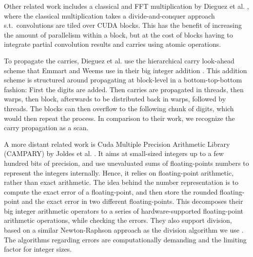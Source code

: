 Other related work includes a classical and FFT multiplication by Dieguez et
al. \cite{doi:10.1177/10943420221077964}, where the classical multiplication
takes a divide-and-conquer approach s.t.\ convolutions are tiled over CUDA
blocks. This has the benefit of increasing the amount of parallelism within a
block, but at the cost of blocks having to integrate partial convolution results
and carries using atomic operations.

To propagate the carries, Dieguez et al. use the hierarchical carry look-ahead
scheme that Emmart and Weems use in their big integer addition
\cite{Emmart2010HighPI}. This addition scheme is structured around propagating
at block-level in a bottom-top-bottom fashion: First the digits are added. Then
carries are propagated in threads, then warps, then block, afterwards to be
distributed back in warps, followed by threads. The blocks can then overflow to
the following chunk of digits, which would then repeat the process. In
comparison to their work, we recognize the carry propagation as a scan.

A more distant related work is Cuda Multiple Precision Arithmetic Library
(CAMPARY) by Joldes et al. \cite{Joldes2016CAMPARYCM}. It aims at small-sized
integers up to a few hundred bits of precision, and use unevaluated sums of
floating-points numbers to represent the integers internally. Hence, it relies
on floating-point arithmetic, rather than exact arithmetic. The idea behind the
number representation is to compute the exact error of a floating-point, and
then store the rounded floating-point and the exact error in two different
floating-points. This decomposes their big integer arithmetic operators to a
series of hardware-supported floating-point arithmetic operations, while
checking the errors. They also support division, based on a similar
Newton-Raphson approach as the division algorithm we use
\cite{watt2023efficient}. The algorithms regarding errors are computationally
demanding and the limiting factor for integer sizes.

